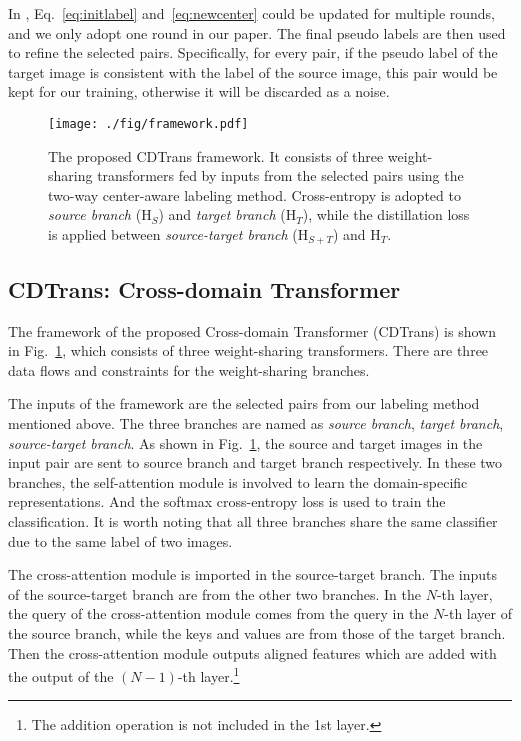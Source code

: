 \documentclass[dvipsnames, svgnames, x11names, table]{article} \usepackage{iclr2022_conference,times}
\begin{document}
\begin{spacing}{1.0}
In \citet{liang2020we}, Eq.~\ref{eq:initlabel} and~\ref{eq:newcenter} could be updated for multiple rounds, and we only adopt one round in our paper. The final pseudo labels are then used to refine the selected pairs. Specifically, for every pair, if the pseudo label of the target image is consistent with the label of the source image, this pair would be kept for our training, otherwise it will be discarded as a noise.

\begin{figure}[!t]
\centering
\texttt{[image: ./fig/framework.pdf]}
\caption{The proposed CDTrans framework. It consists of three weight-sharing transformers fed by inputs from the selected pairs using the two-way center-aware labeling method. Cross-entropy is adopted to \textit{source branch} (H$_{S}$) and \textit{target branch} (H$_T$), while the distillation loss is applied between \textit{source-target branch} (H$_{S+T}$) and H$_T$. }
\vspace{-3mm}
\label{fig:framework}
\end{figure}

\subsection{CDTrans: Cross-domain Transformer}
\label{ssec:cdtrans}
The framework of the proposed Cross-domain Transformer (CDTrans) is shown in Fig.~\ref{fig:framework}, which consists of three weight-sharing transformers. There are three data flows and constraints for the weight-sharing branches.

The inputs of the framework are the selected pairs from our labeling method mentioned above. The three branches are named as \textit{source branch}, \textit{target branch}, \textit{source-target branch}. As shown in Fig.~\ref{fig:framework}, the source and target images in the input pair are sent to source branch and target branch respectively. In these two branches, the self-attention module is involved to learn the domain-specific representations. And the softmax cross-entropy loss is used to train the classification. It is worth noting that all three branches share the same classifier due to the same label of two images.

The cross-attention module is imported in the source-target branch. The inputs of the source-target branch are from the other two branches. In the $N$-th layer, the query of the cross-attention module comes from the query in the $N$-th layer of the source branch, while the keys and values are from those of the target branch. Then the cross-attention module outputs aligned features which are added with the output of the $(N\!-\!1)$-th layer.\footnote{The addition operation is not included in the 1st layer.}


\end{spacing}
\end{document}
